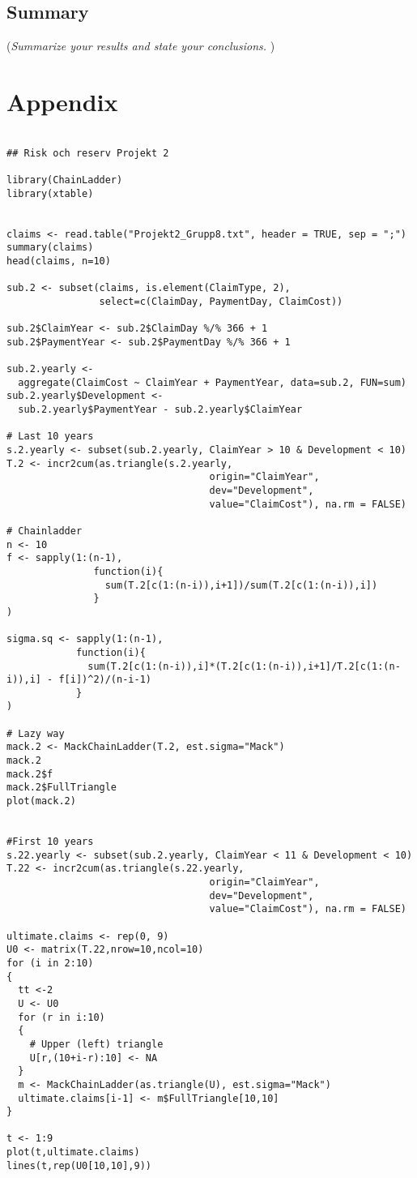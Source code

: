 \documentclass[a4paper]{article}
\begin{document}
\subsection*{Summary}
({\it Summarize your results and state your conclusions. })





\section*{Appendix}

\begin{verbatim}

## Risk och reserv Projekt 2

library(ChainLadder)
library(xtable)


claims <- read.table("Projekt2_Grupp8.txt", header = TRUE, sep = ";")
summary(claims)
head(claims, n=10)

sub.2 <- subset(claims, is.element(ClaimType, 2),
                select=c(ClaimDay, PaymentDay, ClaimCost))

sub.2$ClaimYear <- sub.2$ClaimDay %/% 366 + 1
sub.2$PaymentYear <- sub.2$PaymentDay %/% 366 + 1

sub.2.yearly <- 
  aggregate(ClaimCost ~ ClaimYear + PaymentYear, data=sub.2, FUN=sum)
sub.2.yearly$Development <-
  sub.2.yearly$PaymentYear - sub.2.yearly$ClaimYear

# Last 10 years
s.2.yearly <- subset(sub.2.yearly, ClaimYear > 10 & Development < 10)
T.2 <- incr2cum(as.triangle(s.2.yearly,
                                   origin="ClaimYear",
                                   dev="Development",
                                   value="ClaimCost"), na.rm = FALSE)

# Chainladder
n <- 10
f <- sapply(1:(n-1),
               function(i){
                 sum(T.2[c(1:(n-i)),i+1])/sum(T.2[c(1:(n-i)),i])
               }
)

sigma.sq <- sapply(1:(n-1),
            function(i){
              sum(T.2[c(1:(n-i)),i]*(T.2[c(1:(n-i)),i+1]/T.2[c(1:(n-i)),i] - f[i])^2)/(n-i-1)
            }
)

# Lazy way
mack.2 <- MackChainLadder(T.2, est.sigma="Mack")
mack.2
mack.2$f
mack.2$FullTriangle
plot(mack.2)


#First 10 years
s.22.yearly <- subset(sub.2.yearly, ClaimYear < 11 & Development < 10)
T.22 <- incr2cum(as.triangle(s.22.yearly,
                                   origin="ClaimYear",
                                   dev="Development",
                                   value="ClaimCost"), na.rm = FALSE)

ultimate.claims <- rep(0, 9)
U0 <- matrix(T.22,nrow=10,ncol=10)
for (i in 2:10)
{
  tt <-2
  U <- U0
  for (r in i:10)
  {
    # Upper (left) triangle
    U[r,(10+i-r):10] <- NA
  }
  m <- MackChainLadder(as.triangle(U), est.sigma="Mack")
  ultimate.claims[i-1] <- m$FullTriangle[10,10]
}

t <- 1:9
plot(t,ultimate.claims)
lines(t,rep(U0[10,10],9))
\end{verbatim}
\end{document}

